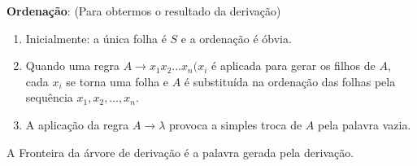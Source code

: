 \textbf{Ordenação}: {\color{red}(Para obtermos o resultado da derivação)}\\

\begin{enumerate}
  \item Inicialmente: a única folha é $S$ e a ordenação é óbvia.
  \item Quando uma regra $A \rightarrow x_{1}x_{2}\ldots x_{n} (x_{i}$ é aplicada para gerar os filhos de $A$, cada $x_{i}$ se torna uma folha e $A$ é substituída na ordenação das folhas pela sequência $x_{1}, x_{2}, \ldots, x_{n}$.
  \item A aplicação da regra $A \rightarrow \lambda$ provoca a simples troca de $A$ pela palavra vazia.
\end{enumerate}

\begin{center}
  A {\color{red}Fronteira} da árvore de derivação é a palavra gerada pela derivação.
\end{center}


